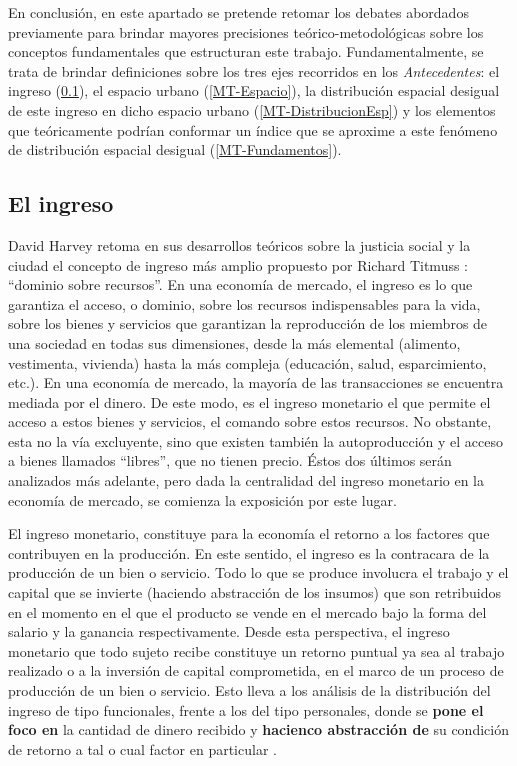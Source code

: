 En conclusión, en este apartado se pretende retomar los debates abordados previamente para brindar mayores precisiones teórico-metodológicas sobre los conceptos fundamentales que estructuran este trabajo. Fundamentalmente, se trata de brindar definiciones sobre los tres ejes recorridos en los \textit{Antecedentes}: el ingreso (\ref{MT-Ingreso}), el espacio urbano (\ref{MT-Espacio}), la distribución espacial desigual de este ingreso en dicho espacio urbano (\ref{MT-DistribucionEsp}) y los elementos que teóricamente podrían conformar un índice que se aproxime a este fenómeno de distribución espacial desigual (\ref{MT-Fundamentos}).
	
\subsection{El ingreso}\label{MT-Ingreso}
	
David Harvey \citeyear{harvey} retoma en sus desarrollos teóricos sobre la justicia social y la ciudad el concepto de ingreso más amplio propuesto por Richard Titmuss \citeyear{titmuss}: “dominio sobre recursos”. En una economía de mercado, el ingreso es lo que garantiza el acceso, o dominio, sobre los recursos indispensables para la vida, sobre los bienes y servicios que garantizan la reproducción de los miembros de una sociedad en todas sus dimensiones, desde la más elemental (alimento, vestimenta, vivienda) hasta la más compleja (educación, salud, esparcimiento, etc.). En una economía de mercado, la mayoría de las transacciones se encuentra mediada por el dinero. De este modo, es el ingreso monetario el que permite el acceso a estos bienes y servicios, el comando sobre estos recursos. No obstante, esta no la vía excluyente, sino que existen también la autoproducción y el acceso a bienes llamados “libres”, que no tienen precio. Éstos dos últimos serán analizados más adelante, pero dada la centralidad del ingreso monetario en la economía de mercado, se comienza la exposición por este lugar.
	
El ingreso monetario, constituye para la economía el retorno a los factores que contribuyen en la producción. En este sentido, el ingreso es la contracara de la producción de un bien o servicio. Todo lo que se produce involucra el trabajo y el capital que se invierte (haciendo abstracción de los insumos) que son retribuidos en el momento en el que el producto se vende en el mercado bajo la forma del salario y la ganancia respectivamente. Desde esta perspectiva, el ingreso monetario que todo sujeto recibe constituye un retorno puntual ya sea al trabajo realizado o a la inversión de capital comprometida, en el marco de un proceso de producción de un bien o servicio. Esto lleva a los análisis de la distribución del ingreso de tipo funcionales, frente a los del tipo personales, donde se \textbf{pone el foco en} la cantidad de dinero recibido y \textbf{hacienco abstracción de} su condición de retorno a tal o cual factor en particular \cite{lindemboim,monza,altimir1986,altimir2002,conade}.
	
